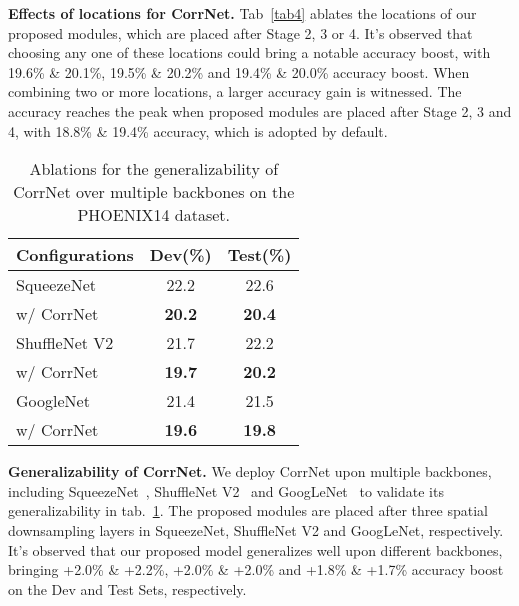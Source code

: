\documentclass[10pt,twocolumn,letterpaper]{article}
\begin{document}
\textbf{Effects of locations for CorrNet.} Tab~\ref{tab4} ablates the locations of our proposed modules, which are placed after Stage 2, 3 or 4. It's observed that choosing any one of these locations could bring a notable accuracy boost, with 19.6\% \& 20.1\%, 19.5\% \& 20.2\% and 19.4\% \& 20.0\% accuracy boost. When combining two or more locations, a larger accuracy gain is witnessed. The accuracy reaches the peak when proposed modules are placed after Stage 2, 3 and 4, with 18.8\% \& 19.4\% accuracy, which is adopted by default.

\begin{table}[t]   
  \centering
  \begin{tabular}{lcc}
  \hline
  Configurations & Dev(\%) & Test(\%)\\
  \hline
  SqueezeNet~\cite{hu2018squeeze}  & 22.2 & 22.6 \\
  \quad w/ CorrNet  & \textbf{20.2}  & \textbf{20.4} \\
  \hline
  ShuffleNet V2~\cite{ma2018shufflenet} & 21.7 & 22.2 \\
  \quad w/ CorrNet  & \textbf{19.7}  & \textbf{20.2} \\
  \hline
  GoogleNet~\cite{szegedy2015going}  & 21.4 & 21.5\\
  \quad w/ CorrNet  & \textbf{19.6} & \textbf{19.8} \\
  \hline
  \end{tabular}
  \caption{Ablations for the generalizability of CorrNet over multiple backbones on the PHOENIX14 dataset.} 
  \label{tab5} 
  \end{table}

\textbf{Generalizability of CorrNet.} We deploy CorrNet upon multiple backbones, including SqueezeNet~\cite{hu2018squeeze}, ShuffleNet V2~\cite{ma2018shufflenet} and GoogLeNet~\cite{szegedy2015going} to validate its generalizability in tab.~\ref{tab5}. The proposed modules are placed after three spatial downsampling layers in SqueezeNet, ShuffleNet V2 and GoogLeNet, respectively. It's observed that our proposed model generalizes well upon different backbones, bringing +2.0\% \& +2.2\%, +2.0\% \& +2.0\% and +1.8\% \& +1.7\% accuracy boost on the Dev and Test Sets, respectively.
\end{document}
